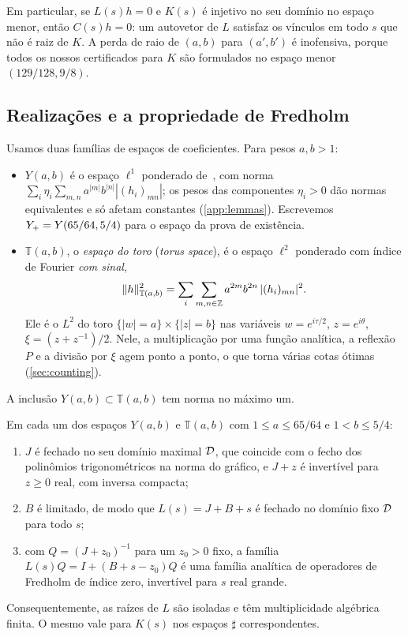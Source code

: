Em particular, se $L(s)h=0$ e $K(s)$ é injetivo no seu domínio no espaço menor, então $C(s)h=0$:
um autovetor de $L$ satisfaz os vínculos em todo $s$ que não é raiz de $K$. A perda de
raio de $(a,b)$ para $(a',b')$ é inofensiva, porque todos os nossos certificados para $K$ são formulados no
espaço menor $(129/128,9/8)$.

\subsection{Realizações e a propriedade de Fredholm}\label{sec:setting-realizations}

Usamos duas famílias de espaços de coeficientes. Para pesos $a,b>1$:
\begin{itemize}[leftmargin=*]
\item $Y(a,b)$ é o espaço $\ell^1$ ponderado de~\cite{RT2019}, com norma
  $\sum_i\eta_i\sum_{m,n}a^{|m|}b^{|n|}|(h_i)_{mn}|$; os pesos das componentes $\eta_i>0$ dão normas
  equivalentes e só afetam constantes (\cref{app:lemmas}). Escrevemos $Y_{+}=Y(65/64,5/4)$ para o espaço da
  prova de existência.
\item $\mathbb T(a,b)$, o \emph{espaço do toro} (\emph{torus space}), é o espaço $\ell^2$ ponderado com índice de Fourier
  \emph{com sinal},
  \[
    \|h\|^2_{\mathbb T(a,b)}=\sum_i\sum_{m,n\in\mathbb{Z}}a^{2m}b^{2n}\,|(h_i)_{mn}|^2 .
  \]
  Ele é o $L^2$ do toro $\{|w|=a\}\times\{|z|=b\}$ nas variáveis $w=e^{i\tau/2}$, $z=e^{i\theta}$,
  $\xi=(z+z^{-1})/2$. Nele, a multiplicação por uma função analítica, a reflexão $P$ e a divisão por
  $\xi$ agem ponto a ponto, o que torna várias cotas ótimas (\cref{sec:counting}).
\end{itemize}
A inclusão $Y(a,b)\subset\mathbb T(a,b)$ tem norma no máximo um.

\begin{proposition}\label{prop:fredholm}
Em cada um dos espaços $Y(a,b)$ e $\mathbb T(a,b)$ com $1\le a\le65/64$ e $1<b\le5/4$:
\begin{enumerate}[label=\textup{(\roman*)},leftmargin=*]
\item $J$ é fechado no seu domínio maximal $\mathcal{D}$, que coincide com o fecho dos polinômios trigonométricos
  na norma do gráfico, e $J+z$ é invertível para $z\ge0$ real, com inversa compacta;
\item $B$ é limitado, de modo que $L(s)=J+B+s$ é fechado no domínio fixo $\mathcal{D}$ para todo $s$;
\item com $Q=(J+z_0)^{-1}$ para um $z_0>0$ fixo, a família $L(s)Q=I+(B+s-z_0)Q$ é uma família
  analítica de operadores de Fredholm de índice zero, invertível para $s$ real grande.
\end{enumerate}
Consequentemente, as raízes de $L$ são isoladas e têm multiplicidade algébrica finita. O mesmo vale para
$K(s)$ nos espaços $\sharp$ correspondentes.
\end{proposition}

